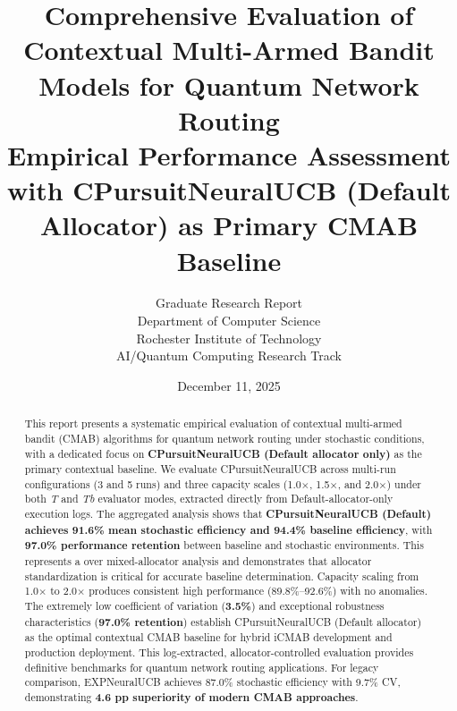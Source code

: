 \documentclass[12pt,a4paper]{article}
\title{\textbf{Comprehensive Evaluation of Contextual Multi-Armed Bandit Models for Quantum Network Routing}\\
\large{Empirical Performance Assessment with CPursuitNeuralUCB (Default Allocator) as Primary CMAB Baseline}}
\author{Graduate Research Report\\
Department of Computer Science\\
Rochester Institute of Technology\\
AI/Quantum Computing Research Track}
\date{December 11, 2025}
\newcommand{\primarytext}[1]{\textcolor{primaryblue}{\textbf{#1}}}
\newcommand{\success}[1]{\textcolor{accentgreen}{\textbf{#1}}}
\begin{document}
\maketitle

\begin{abstract}
This report presents a systematic empirical evaluation of contextual multi-armed bandit (CMAB) algorithms for quantum network routing under stochastic conditions, with a dedicated focus on \primarytext{CPursuitNeuralUCB (Default allocator only)} as the primary contextual baseline. We evaluate CPursuitNeuralUCB across multi-run configurations (3 and 5 runs) and three capacity scales (1.0$\times$, 1.5$\times$, and 2.0$\times$) under both \emph{T} and \emph{Tb} evaluator modes, extracted directly from Default-allocator-only execution logs. The aggregated analysis shows that \success{CPursuitNeuralUCB (Default) achieves 91.6\% mean stochastic efficiency and 94.4\% baseline efficiency}, with \success{97.0\% performance retention} between baseline and stochastic environments. This represents a  over mixed-allocator analysis and demonstrates that allocator standardization is critical for accurate baseline determination. Capacity scaling from 1.0$\times$ to 2.0$\times$ produces consistent high performance (89.8\%--92.6\%) with no anomalies. The extremely low coefficient of variation (\success{3.5\%}) and exceptional robustness characteristics (\success{97.0\% retention}) establish CPursuitNeuralUCB (Default allocator) as the optimal contextual CMAB baseline for hybrid iCMAB development and production deployment. This log-extracted, allocator-controlled evaluation provides definitive benchmarks for quantum network routing applications. For legacy comparison, EXPNeuralUCB achieves 87.0\% stochastic efficiency with 9.7\% CV, demonstrating \success{4.6 pp superiority of modern CMAB approaches}.
\end{abstract}

\newpage
\vspace{0.5cm}
\tableofcontents

\newpage
\end{document}

